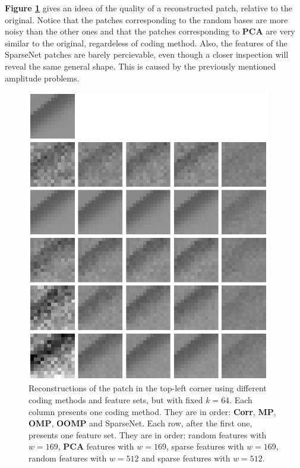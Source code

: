 \documentclass[12pt,a4paper,oneside,english]{UPBThesis}
\begin{document}
\textbf{Figure \ref{fig:RecSparsePictures}} gives an ideea of the quality of a reconstructed patch, relative to the original. Notice that the patches corresponding to the random bases are more noisy than the other ones and that the patches corresponding to \textbf{PCA} are very similar to the original, regardeless of coding method. Also, the features of the SparseNet patches are barely percievable, even though a closer inspection will reveal the same general shape. This is caused by the previously mentioned amplitude problems.

\begin{figure}
\centering
\includegraphics[width=0.95\textwidth,height=0.8\textheight]{thesis_data/recsparse/rec_pictures.png}
\caption{Reconstructions of the patch in the top-left corner using different coding methods and feature sets, but with fixed $k=64$. Each column presents one coding method. They are in order: \textbf{Corr}, \textbf{MP}, \textbf{OMP}, \textbf{OOMP} and SparseNet. Each row, after the first one, presents one feature set. They are in order: random features with $w=169$, \textbf{PCA} features with $w=169$, sparse features with $w=169$, random features with $w=512$ and sparse features with $w=512$.}
\label{fig:RecSparsePictures}
\end{figure}
\end{document}
